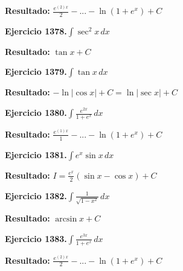 \documentclass[10pt,a4paper]{article}
\begin{document}
\begin{solbox}
\textbf{Resultado:} \(\displaystyle \frac{e^{(2)x}}{2} - ... - \ln(1+e^x) + C\)
\end{solbox}

\newpage
\begin{ejbox}
\textbf{Ejercicio 1378.}\quad $\int \sec^2 x\,dx$
\end{ejbox}

\begin{solbox}
\textbf{Resultado:} \(\displaystyle \tan x + C\)
\end{solbox}

\begin{ejbox}
\textbf{Ejercicio 1379.}\quad $\int \tan x\,dx$
\end{ejbox}

\begin{solbox}
\textbf{Resultado:} \(\displaystyle -\ln|\cos x| + C = \ln|\sec x| + C\)
\end{solbox}

\begin{ejbox}
\textbf{Ejercicio 1380.}\quad $\int \frac{e^{2x}}{1+e^{x}}\,dx$
\end{ejbox}

\begin{solbox}
\textbf{Resultado:} \(\displaystyle \frac{e^{(1)x}}{1} - ... - \ln(1+e^x) + C\)
\end{solbox}

\newpage
\begin{ejbox}
\textbf{Ejercicio 1381.}\quad $\int e^x\sin x\,dx$
\end{ejbox}

\begin{solbox}
\textbf{Resultado:} \(\displaystyle I = \frac{e^x}{2}(\sin x - \cos x) + C\)
\end{solbox}

\begin{ejbox}
\textbf{Ejercicio 1382.}\quad $\int \frac{1}{\sqrt{1-x^2}}\,dx$
\end{ejbox}

\begin{solbox}
\textbf{Resultado:} \(\displaystyle \arcsin x + C\)
\end{solbox}

\begin{ejbox}
\textbf{Ejercicio 1383.}\quad $\int \frac{e^{3x}}{1+e^{x}}\,dx$
\end{ejbox}

\begin{solbox}
\textbf{Resultado:} \(\displaystyle \frac{e^{(2)x}}{2} - ... - \ln(1+e^x) + C\)
\end{solbox}
\end{document}

